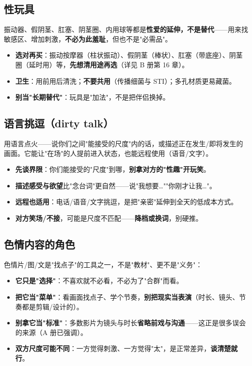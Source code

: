 \documentclass[12pt,UTF8,openany]{ctexbook}
\begin{document}
\subsection*{性玩具}
振动器、假阴茎、肛塞、阴茎圈、内用球等都是\textbf{性爱的延伸，不是替代}——用来找敏感区、增加刺激，\textbf{不必为此羞耻}，但也不是"必需品"。
\begin{itemize}[leftmargin=2em,itemsep=0.3em]
  \item \textbf{选对再买}：振动按摩器（柱状振动）、假阴茎（棒状）、肛塞（带底座）、阴茎圈（延时用）等，\textbf{先想清用途再选}（详见 B 册第 16 章）。
  \item \textbf{卫生}：用前用后清洗；\textbf{不要共用}（传播细菌与 STI）；多孔材质更易藏菌。
  \item \textbf{别当"长期替代"}：玩具是"加法"，不是把伴侣换掉。
\end{itemize}
\subsection*{语言挑逗（dirty talk）}
用语言点火——说你们之间"能接受的尺度"内的话，或描述正在发生/即将发生的画面。它能让"在场"的人提前进入状态，也能远程使用（语音/文字）。
\begin{itemize}[leftmargin=2em,itemsep=0.3em]
  \item \textbf{先谈界限}：你们能接受的"尺度"到哪，\textbf{别拿对方的"性趣"开玩笑}。
  \item \textbf{描述感受与欲望}比"念台词"更自然——说"我想要…""你刚才让我…"。
  \item \textbf{远程也适用}：电话/语音/文字挑逗，是把"亲密"延伸到全天的低成本方式。
  \item \textbf{对方笑场/不接}，可能是尺度不匹配——\textbf{降档或换词}，别硬推。
\end{itemize}
\subsection*{色情内容的角色}
色情片/图/文是"找点子"的工具之一，不是"教材"、更不是"义务"：
\begin{itemize}[leftmargin=2em,itemsep=0.3em]
  \item \textbf{它只是"选择"}：不喜欢就不必看，不必为了"合群"而看。
  \item \textbf{把它当"菜单"}：看画面找点子、学个节奏，\textbf{别把现实当表演}（时长、镜头、节奏都是剪辑/设计的）。
  \item \textbf{别拿它当"标准"}：多数影片为镜头与时长\textbf{省略前戏与沟通}——这正是很多误会的来源（A 册已强调）。
  \item \textbf{双方尺度可能不同}：一方觉得刺激、一方觉得"太"，是正常差异，\textbf{谈清楚就行}。
\end{itemize}
\end{document}
